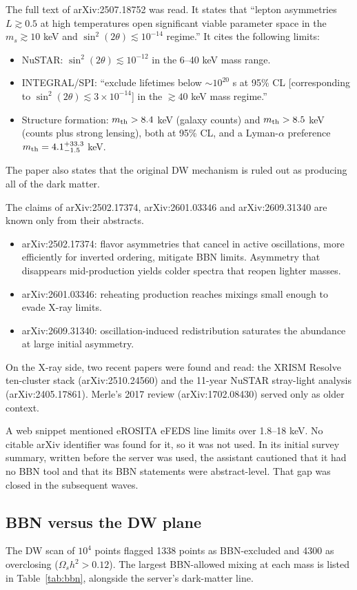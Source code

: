 \documentclass[11pt,a4paper]{article}
\begin{document}
The full text of arXiv:2507.18752 was read. It states that ``lepton asymmetries $L\gtrsim0.5$ at high temperatures open significant viable parameter space in the $m_s\gtrsim10$ keV and $\sin^2(2\theta)\lesssim10^{-14}$ regime.'' It cites the following limits:
\begin{itemize}
\item NuSTAR: $\sin^2(2\theta)\lesssim10^{-12}$ in the 6--40 keV mass range.
\item INTEGRAL/SPI: ``exclude lifetimes below $\sim10^{20}$ s at 95\% CL [corresponding to $\sin^2(2\theta)\lesssim3\times10^{-14}$] in the $\gtrsim40$ keV mass regime.''
\item Structure formation: $m_{\rm th}>8.4$ keV (galaxy counts) and $m_{\rm th}>8.5$ keV (counts plus strong lensing), both at 95\% CL, and a Lyman-$\alpha$ preference $m_{\rm th}=4.1^{+33.3}_{-1.5}$ keV.
\end{itemize}
The paper also states that the original DW mechanism is ruled out as producing all of the dark matter.

The claims of arXiv:2502.17374, arXiv:2601.03346 and arXiv:2609.31340 are known only from their abstracts.
\begin{itemize}
\item arXiv:2502.17374: flavor asymmetries that cancel in active oscillations, more efficiently for inverted ordering, mitigate BBN limits. Asymmetry that disappears mid-production yields colder spectra that reopen lighter masses.
\item arXiv:2601.03346: reheating production reaches mixings small enough to evade X-ray limits.
\item arXiv:2609.31340: oscillation-induced redistribution saturates the abundance at large initial asymmetry.
\end{itemize}

On the X-ray side, two recent papers were found and read: the XRISM Resolve ten-cluster stack (arXiv:2510.24560) and the 11-year NuSTAR stray-light analysis (arXiv:2405.17861). Merle's 2017 review (arXiv:1702.08430) served only as older context.

A web snippet mentioned eROSITA eFEDS line limits over 1.8--18 keV. No citable arXiv identifier was found for it, so it was not used. In its initial survey summary, written before the server was used, the assistant cautioned that it had no BBN tool and that its BBN statements were abstract-level. That gap was closed in the subsequent waves.

\subsection{BBN versus the DW plane}
The DW scan of $10^4$ points flagged 1338 points as BBN-excluded and 4300 as overclosing ($\Omega_s h^2>0.12$). The largest BBN-allowed mixing at each mass is listed in Table~\ref{tab:bbn}, alongside the server's dark-matter line.
\end{document}
